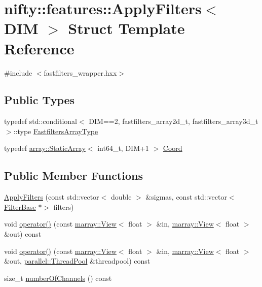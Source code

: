 \hypertarget{structnifty_1_1features_1_1ApplyFilters}{}\section{nifty\+:\+:features\+:\+:Apply\+Filters$<$ D\+IM $>$ Struct Template Reference}
\label{structnifty_1_1features_1_1ApplyFilters}


{\ttfamily \#include $<$fastfilters\+\_\+wrapper.\+hxx$>$}

\subsection*{Public Types}
\begin{DoxyCompactItemize}
\item 
typedef std\+::conditional$<$ D\+IM==2, fastfilters\+\_\+array2d\+\_\+t, fastfilters\+\_\+array3d\+\_\+t $>$\+::type \hyperlink{structnifty_1_1features_1_1ApplyFilters_adfddd3f0fdaa0179cc23100901565774}{Fastfilters\+Array\+Type}
\item 
typedef \hyperlink{namespacenifty_1_1array_a683f151f19c851754e0c6d55ed16a0c2}{array\+::\+Static\+Array}$<$ int64\+\_\+t, D\+IM+1 $>$ \hyperlink{structnifty_1_1features_1_1ApplyFilters_a0a26d161f300b3394044f1357ae5ebfd}{Coord}
\end{DoxyCompactItemize}
\subsection*{Public Member Functions}
\begin{DoxyCompactItemize}
\item 
\hyperlink{structnifty_1_1features_1_1ApplyFilters_ad851e87ed8e1ec3ba63fb11e58aa2856}{Apply\+Filters} (const std\+::vector$<$ double $>$ \&sigmas, const std\+::vector$<$ \hyperlink{structnifty_1_1features_1_1FilterBase}{Filter\+Base} $\ast$$>$ filters)
\item 
void \hyperlink{structnifty_1_1features_1_1ApplyFilters_a63d2a6c7fca07fed1921c6c8bf8ecc19}{operator()} (const \hyperlink{classandres_1_1View}{marray\+::\+View}$<$ float $>$ \&in, \hyperlink{classandres_1_1View}{marray\+::\+View}$<$ float $>$ \&out) const
\item 
void \hyperlink{structnifty_1_1features_1_1ApplyFilters_af1316760b67e21d2c3f647313942f087}{operator()} (const \hyperlink{classandres_1_1View}{marray\+::\+View}$<$ float $>$ \&in, \hyperlink{classandres_1_1View}{marray\+::\+View}$<$ float $>$ \&out, \hyperlink{classnifty_1_1parallel_1_1ThreadPool}{parallel\+::\+Thread\+Pool} \&threadpool) const
\item 
size\+\_\+t \hyperlink{structnifty_1_1features_1_1ApplyFilters_a7f28df00a4ecfcbeff8cafcae8d7a2b5}{number\+Of\+Channels} () const
\end{DoxyCompactItemize}


